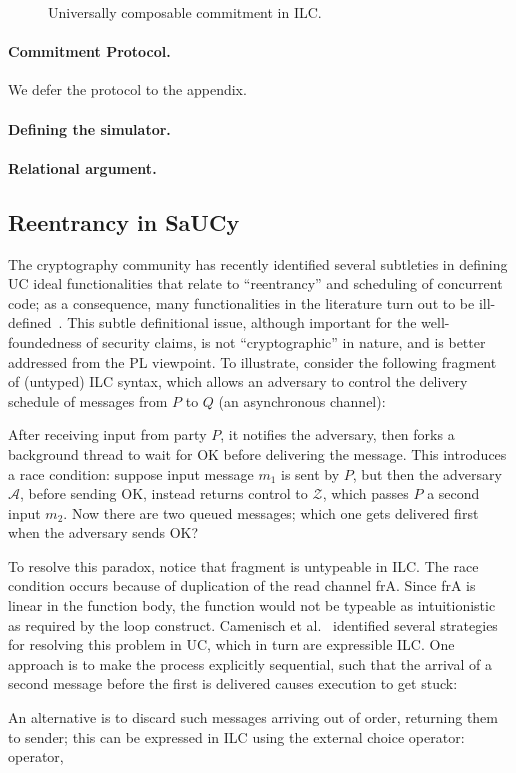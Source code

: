 \begin{figure}

\caption{Universally composable commitment in ILC.}
\label{fig:ucc}
\end{figure}

\paragraph{Commitment Protocol.}
We defer the protocol to the appendix.

\paragraph{Defining the simulator.}

\paragraph{Relational argument.}

\subsection{Reentrancy in SaUCy}
\label{subsec:reentrancy}

The cryptography community has recently identified several subtleties in defining UC ideal functionalities that relate to ``reentrancy'' and scheduling of concurrent code;
as a consequence, many functionalities in the literature turn out to be ill-defined~\cite{camenisch2016universal}.
This subtle definitional issue, although important for the well-foundedness of security claims,
is not ``cryptographic'' in nature, and is better addressed from the PL viewpoint.
To illustrate, consider the following fragment of (untyped) ILC syntax, which allows an adversary to control the delivery schedule of messages from $P$ to $Q$ (an asynchronous channel):

After receiving input from party $P$, it
notifies the adversary, then forks a background thread to wait for \textsf{OK} before
delivering the message.
This introduces a race condition: suppose input message $m_1$ is sent by $P$, but then the adversary $\mathcal A$, before sending \textsf{OK}, instead returns control to $\mathcal Z$, which passes $P$ a second input $m_2$. Now there are two queued messages; which one gets delivered first when the adversary sends \textsf{OK}?

To resolve this paradox, notice that fragment is untypeable in ILC.
The race condition occurs because of duplication of the read channel \textsf{frA}.
Since \textsf{frA} is linear in the function body, the function would not be typeable as intuitionistic as required by the \textsf{loop} construct.
Camenisch et al.~\cite{camenisch2016universal} identified several strategies for resolving this problem in UC, which in turn are expressible ILC. One approach is to make the process explicitly sequential, such that the arrival of a second message before the first is delivered causes execution to get stuck:

An alternative is to discard such messages arriving out of order, returning them to sender; this can be expressed in ILC using the external choice operator:
operator,

